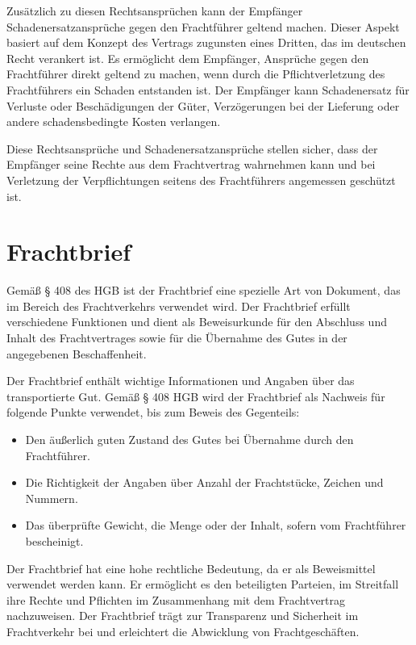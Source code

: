 Zusätzlich zu diesen Rechtsansprüchen kann der Empfänger Schadenersatzansprüche gegen den Frachtführer geltend machen. Dieser Aspekt basiert auf dem Konzept des Vertrags zugunsten eines Dritten, das im deutschen Recht verankert ist. Es ermöglicht dem Empfänger, Ansprüche gegen den Frachtführer direkt geltend zu machen, wenn durch die Pflichtverletzung des Frachtführers ein Schaden entstanden ist. Der Empfänger kann Schadenersatz für Verluste oder Beschädigungen der Güter, Verzögerungen bei der Lieferung oder andere schadensbedingte Kosten verlangen.

Diese Rechtsansprüche und Schadenersatzansprüche stellen sicher, dass der Empfänger seine Rechte aus dem Frachtvertrag wahrnehmen kann und bei Verletzung der Verpflichtungen seitens des Frachtführers angemessen geschützt ist.

\section{Frachtbrief}

Gemäß § 408 des \ac{HGB} ist der Frachtbrief eine spezielle Art von Dokument, das im Bereich des Frachtverkehrs verwendet wird. Der Frachtbrief erfüllt verschiedene Funktionen und dient als Beweisurkunde für den Abschluss und Inhalt des Frachtvertrages sowie für die Übernahme des Gutes in der angegebenen Beschaffenheit.

Der Frachtbrief enthält wichtige Informationen und Angaben über das transportierte Gut. Gemäß § 408 HGB wird der Frachtbrief als Nachweis für folgende Punkte verwendet, bis zum Beweis des Gegenteils:

\begin{itemize}
    \item Den äußerlich guten Zustand des Gutes bei Übernahme durch den Frachtführer.
    \item Die Richtigkeit der Angaben über Anzahl der Frachtstücke, Zeichen und Nummern.
    \item Das überprüfte Gewicht, die Menge oder der Inhalt, sofern vom Frachtführer bescheinigt.
\end{itemize}

Der Frachtbrief hat eine hohe rechtliche Bedeutung, da er als Beweismittel verwendet werden kann. Er ermöglicht es den beteiligten Parteien, im Streitfall ihre Rechte und Pflichten im Zusammenhang mit dem Frachtvertrag nachzuweisen. Der Frachtbrief trägt zur Transparenz und Sicherheit im Frachtverkehr bei und erleichtert die Abwicklung von Frachtgeschäften.

